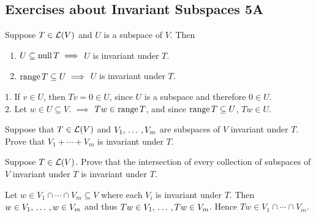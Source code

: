 \subsection*{Exercises about Invariant Subspaces 5A}

\begin{xrcs}
  Suppose $T \in \mathcal{L}(V)$ and $U$ is a subspace of $V$. Then
  \begin{enumerate}
    \item $U \subseteq \operatorname{null} T \implies$ $U$ is invariant under $T$.
    \item $\operatorname{range} T \subseteq U \implies$ $U$ is invariant under $T$.
  \end{enumerate}
\end{xrcs}
\begin{prf}
  { }1. { }If $v \in U$, then $Tv = 0 \in U$, since $U$ is a subspace and therefore $0 \in U$. \\
  2. { }Let $w \in U\subseteq V$. $\implies$ $Tw \in \operatorname{range} T$, and since $\operatorname{range} T \subseteq U$, $Tw \in U$.
\end{prf}

\begin{xrcs}
  Suppose that $T \in \mathcal{L} (V)$ and $V_1, {\, \ldots \,\,}, V_m$ are subspaces of $V$ invariant under $T$. \\
  Prove that $V_1 + \cdots + V_m$ is invariant under $T$.
\end{xrcs}

\begin{xrcs}
  Suppose $T \in \mathcal{L}(V)$. Prove that the intersection of every collection of subspaces of $V$ invariant under $T$ is invariant under $T$.
\end{xrcs}
\begin{prf}
  Let $w \in V_1 \cap \cdots \cap V_m \subseteq V$ where each $V_i$ is invariant under $T$. Then $w \in V_1, {\, \ldots \,\,}, w \in V_m$ and thus $Tw \in V_1, {\, \ldots \,\,}, Tw \in V_m$. Hence $Tw \in V_1 \cap \cdots \cap V_m$.
\end{prf}